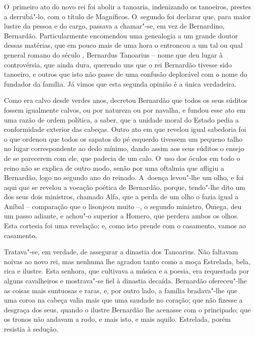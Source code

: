 O~primeiro ato do novo rei foi abolir a tanoaria, indenizando os
tanoeiros, prestes a derrubá"-lo, com o título de Magníficos. O~segundo
foi declarar que, para maior lustre da pessoa e do cargo, passava a
chamar"-se, em vez de Bernardino, Bernardão. Particularmente encomendou
uma genealogia a um grande doutor dessas matérias, que em pouco mais de
uma hora o entroncou a um tal ou qual general romano do século ,
Bernardus Tanoarius -- nome que deu lugar à controvérsia, que ainda
dura, querendo uns que o rei Bernardão tivesse sido tanoeiro, e outros
que isto não passe de uma confusão deplorável com o nome do fundador da
família. Já vimos que esta segunda opinião é a única verdadeira.

Como era calvo desde verdes anos, decretou Bernardão que todos os seus
súditos fossem igualmente calvos, ou por natureza ou por navalha, e
fundou esse ato em uma razão de ordem política, a saber, que a unidade
moral do Estado pedia a conformidade exterior das cabeças. Outro ato em
que revelou igual sabedoria foi o que ordenou que todos os sapatos do pé
esquerdo tivessem um pequeno talho no lugar correspondente ao dedo
mínimo, dando assim aos seus súditos o ensejo de se parecerem com ele,
que padecia de um calo. O~uso dos óculos em todo o reino não se explica
de outro modo, senão por uma oftalmia que afligiu a Bernardão, logo no
segundo ano do reinado. A~doença levou"-lhe um olho, e foi aqui que se
revelou a vocação poética de Bernardão, porque, tendo"-lhe dito um dos
seus dois ministros, chamado Alfa, que a perda de um olho o fazia igual
a Aníbal -- comparação que o lisonjeou muito --, o segundo ministro,
Ômega, deu um passo adiante, e achou"-o superior a Homero, que perdera
ambos os olhos. Esta cortesia foi uma revelação; e, como isto prende com
o casamento, vamos ao casamento.

Tratava"-se, em verdade, de assegurar a dinastia dos Tanoarius. Não
faltavam noivas ao novo rei, mas nenhuma lhe agradou tanto como a moça
Estrelada, bela, rica e ilustre. Esta senhora, que cultivava a música e
a poesia, era requestada por alguns cavalheiros e mostrava"-se fiel à
dinastia decaída. Bernardão ofereceu"-lhe as coisas mais suntuosas e
raras, e, por outro lado, a família bradava"-lhe que uma coroa na cabeça
valia mais que uma saudade no coração; que não fizesse a desgraça dos
seus, quando o ilustre Bernardão lhe acenasse com o principado; que os
tronos não andavam a rodo, e mais isto, e mais aquilo. Estrelada, porém
resistia à sedução.

